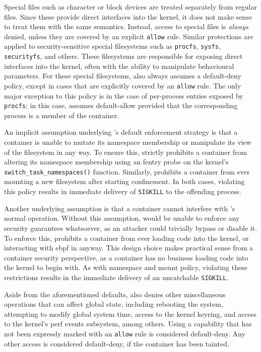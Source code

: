 Special files such as character or block devices are treated separately from regular
files. Since these provide direct interfaces into the kernel, it does not make sense to
treat them with the same semantics. Instead, access to special files is \textit{always}
denied, unless they are covered by an explicit \texttt{allow} rule. Similar protections
are applied to security-sensitive special filesystems such as \texttt{procfs},
\texttt{sysfs}, \texttt{securityfs}, and others. These filesystems are responsible for
exposing direct interfaces into the kernel, often with the ability to manipulate
behavioural parameters. For these special filesystems, \bpfcontain{} also always assumes
a default-deny policy, except in cases that are explicitly covered by an \texttt{allow}
rule. The only major exception to this policy is in the case of per-process entries
exposed by \texttt{procfs}; in this case, \bpfcontain{} assumes default-allow provided
that the corresponding process is a member of the container.

An implicit assumption underlying \bpfcontain{}'s default enforcement strategy is that
a container is unable to mutate its namespace membership or manipulate its view of the
filesystem in any way. To ensure this, \bpfcontain{} strictly prohibits a container from
altering its namespace membership using an fentry probe on the kernel's
\texttt{switch\_task\_namespaces()} function. Similarly, \bpfcontain{} prohibits
a container from ever mounting a new filesystem after starting confinement. In both cases,
violating this policy results in immediate delivery of \texttt{SIGKILL} to the offending
process.

Another underlying assumption is that a container cannot interfere with \bpfcontain{}'s
normal operation. Without this assumption, \bpfcontain{} would be unable to enforce any
security guarantees whatsoever, as an attacker could trivially bypass or disable it. To
enforce this, \bpfcontain{} prohibits a container from ever loading code into the kernel,
or interacting with \gls{ebpf} in anyway. This design choice makes practical sense from
a container security perspective, as a container has no business loading code into the
kernel to begin with. As with namespace and mount policy, violating these restrictions
results in the immediate delivery of an uncatchable \texttt{SIGKILL}.

Aside from the aforementioned defaults, \bpfcontain{} also denies other miscellaneous
operations that can affect global state, including rebooting the system, attempting to
modify global system time, access to the kernel keyring, and access to the kernel's perf
events subsystem, among others. Using a capability that has not been expressly marked with
an \texttt{allow} rule is considered default-deny. Any other access is considered
default-deny, if the container has been tainted.

